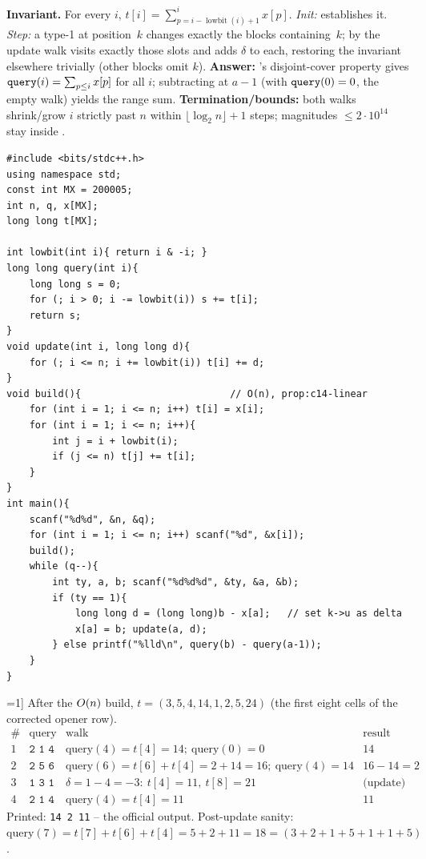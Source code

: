 \begin{proofbox}
\textbf{Invariant.} For every \(i\), \(t[i]=\sum_{p=i-\operatorname{lowbit}(i)+1}^{i} x[p]\).
\emph{Init:}  establishes it. \emph{Step:} a type-1 at
position~\(k\) changes exactly the blocks containing~\(k\); by
 the update walk visits exactly those slots and adds
\(\delta\) to each, restoring the invariant elsewhere trivially (other blocks
omit \(k\)).
\textbf{Answer:} 's disjoint-cover property gives
\(\texttt{query}(i)=\sum_{p\le i}x[p]\) for all \(i\); subtracting at
\(a{-}1\) (with \(\texttt{query}(0)=0\), the empty walk) yields the range sum.
\textbf{Termination/bounds:} both walks shrink/grow \(i\) strictly past \(n\)
within \(\lfloor\log_2 n\rfloor+1\) steps; magnitudes \(\le 2\cdot10^{14}\)
stay inside .
\end{proofbox}

\begin{lstlisting}[caption={CSES 1648 full solution (plain BIT, set-as-delta)}, label={lst:c14-1648-soln}]
#include <bits/stdc++.h>
using namespace std;
const int MX = 200005;
int n, q, x[MX];
long long t[MX];

int lowbit(int i){ return i & -i; }
long long query(int i){
    long long s = 0;
    for (; i > 0; i -= lowbit(i)) s += t[i];
    return s;
}
void update(int i, long long d){
    for (; i <= n; i += lowbit(i)) t[i] += d;
}
void build(){                          // O(n), prop:c14-linear
    for (int i = 1; i <= n; i++) t[i] = x[i];
    for (int i = 1; i <= n; i++){
        int j = i + lowbit(i);
        if (j <= n) t[j] += t[i];
    }
}
int main(){
    scanf("%d%d", &n, &q);
    for (int i = 1; i <= n; i++) scanf("%d", &x[i]);
    build();
    while (q--){
        int ty, a, b; scanf("%d%d%d", &ty, &a, &b);
        if (ty == 1){
            long long d = (long long)b - x[a];   // set k->u as delta
            x[a] = b; update(a, d);
        } else printf("%lld\n", query(b) - query(a-1));
    }
}
\end{lstlisting}

\begin{tracebox}[CSES 1648: a=(3,2,4,5,1,1,5,3), then set x[3]=1]
After the \(O(n)\) build, \(t=(3,5,4,14,1,2,5,24)\) (the first eight
cells of the corrected opener row).
\[
\renewcommand{\arraystretch}{1.15}
\begin{array}{c|l|l|l}
\text{\#} & \text{query} & \text{walk} & \text{result}\\ \hline
1 & \texttt{2 1 4} & \text{query}(4){=}t[4]{=}14;\ \text{query}(0){=}0 & 14\\
2 & \texttt{2 5 6} & \text{query}(6){=}t[6]{+}t[4]{=}2{+}14{=}16;\ \text{query}(4){=}14 & 16-14=2\\
3 & \texttt{1 3 1} & \delta=1{-}4{=}-3:\ t[4]{=}11,\ t[8]{=}21 & \text{(update)}\\
4 & \texttt{2 1 4} & \text{query}(4){=}t[4]{=}11 & 11
\end{array}
\]
Printed: \texttt{14 2 11} -- the official output.  Post-update sanity:
\(\text{query}(7)=t[7]+t[6]+t[4]=5+2+11=18=(3{+}2{+}1{+}5{+}1{+}1{+}5)\).
\end{tracebox}

